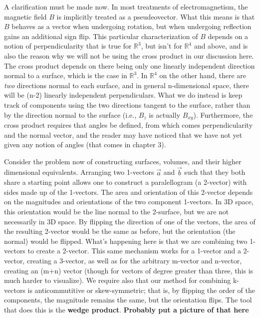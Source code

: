 \documentclass{book}
\begin{document}
A clarification must be made now. In most treatments of electromagnetism, the magnetic field $B$ is implicitly treated as a pseudeovector. What this means is that $B$ behaves as a vector when undergoing rotation, but when undergoing reflection gains an additional sign flip. This particular characterization of $B$ depends on a notion of perpendicularity that is true for $\mathbb{R}^3$, but isn't for $\mathbb{R}^4$ and above, and is also the reason why we will not be using the cross product in our discussion here. The cross product depends on there being only one linearly independent direction normal to a surface, which is the case in $\mathbb{R}^3$. In $\mathbb{R}^4$ on the other hand, there are \emph{two} directions normal to each surface, and in general n-dimensional space, there will be (n-2) linearly independent perpendiculars. What we do instead is keep track of components using the two directions tangent to the surface, rather than by the direction normal to the surface (i.e., $B_z$ is actually $B_{xy}$). Furthermore, the cross product requires that angles be defined, from which comes perpendicularity and the normal vector, and the reader may have noticed that we have not yet given any notion of angles (that comes in chapter 3). 



Consider the problem now of constructing surfaces, volumes, and their higher dimensional equivalents. Arranging two 1-vectors $\vec{a}$ and $\vec{b}$ such that they both share a starting point allows one to construct a paralellogram (a 2-vector) with sides made up of the 1-vectors. The area and orientation of this 2-vector depends on the magnitudes and orientations of the two component 1-vectors. In 3D space, this orientation would be the line normal to the 2-surface, but we are not necessarily in 3D space. By flipping the direction of one of the vectors, the area of the resulting 2-vector would be the same as before, but the orientation (the normal) would be flipped. What's happening here is that we are combining two 1-vectors to create a 2-vector. This same mechanism works for a 1-vector and a 2-vector, creating a 3-vector, as well as for the arbitrary m-vector and n-vector, creating an (m+n) vector (though for vectors of degree greater than three, this is much harder to visualize). We require also that our method for combining k-vectors is anticommutitive or skew-symmetric; that is, by flipping the order of the components, the magnitude remains the same, but the orientation flips. The tool that does this is the \textbf{wedge product}.
\textbf{Probably put a picture of that here}
\end{document}
